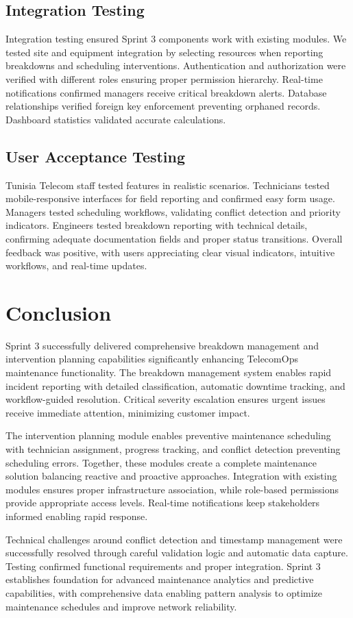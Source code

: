 \subsection{Integration Testing}

Integration testing ensured Sprint 3 components work with existing modules. We tested site and equipment integration by selecting resources when reporting breakdowns and scheduling interventions. Authentication and authorization were verified with different roles ensuring proper permission hierarchy. Real-time notifications confirmed managers receive critical breakdown alerts. Database relationships verified foreign key enforcement preventing orphaned records. Dashboard statistics validated accurate calculations.

\subsection{User Acceptance Testing}

Tunisia Telecom staff tested features in realistic scenarios. Technicians tested mobile-responsive interfaces for field reporting and confirmed easy form usage. Managers tested scheduling workflows, validating conflict detection and priority indicators. Engineers tested breakdown reporting with technical details, confirming adequate documentation fields and proper status transitions. Overall feedback was positive, with users appreciating clear visual indicators, intuitive workflows, and real-time updates.

\section{Conclusion}

Sprint 3 successfully delivered comprehensive breakdown management and intervention planning capabilities significantly enhancing TelecomOps maintenance functionality. The breakdown management system enables rapid incident reporting with detailed classification, automatic downtime tracking, and workflow-guided resolution. Critical severity escalation ensures urgent issues receive immediate attention, minimizing customer impact.

The intervention planning module enables preventive maintenance scheduling with technician assignment, progress tracking, and conflict detection preventing scheduling errors. Together, these modules create a complete maintenance solution balancing reactive and proactive approaches. Integration with existing modules ensures proper infrastructure association, while role-based permissions provide appropriate access levels. Real-time notifications keep stakeholders informed enabling rapid response.

Technical challenges around conflict detection and timestamp management were successfully resolved through careful validation logic and automatic data capture. Testing confirmed functional requirements and proper integration. Sprint 3 establishes foundation for advanced maintenance analytics and predictive capabilities, with comprehensive data enabling pattern analysis to optimize maintenance schedules and improve network reliability.